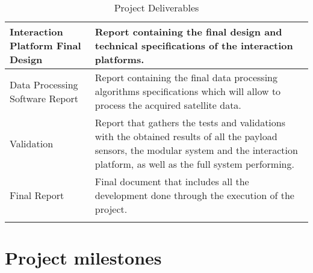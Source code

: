 \begin{longtable}[H]{>{\raggedright\arraybackslash}p{4cm} p{10cm}}
	Interaction Platform Final Design  & Report containing the final design and technical specifications of the interaction platforms.\vspace{0.2cm} \\
	
	\midrule

	Data Processing Software Report  & Report containing the final data processing algorithms specifications which will allow to process the acquired satellite data.\vspace{0.2cm} \\
	
	\midrule

	Validation & Report that gathers the tests and validations with the obtained results of all the payload sensors, the modular system and the interaction platform, as well as the full system performing.\vspace{0.2cm} \\
	
	\midrule
		
	Final Report & Final document that includes all the development done through the execution of the project.\vspace{0.2cm} \\ 
	
	\bottomrule[2pt]
	
	\caption{Project Deliverables}
	\label{PDel}
\end{longtable}

\section{Project milestones}

